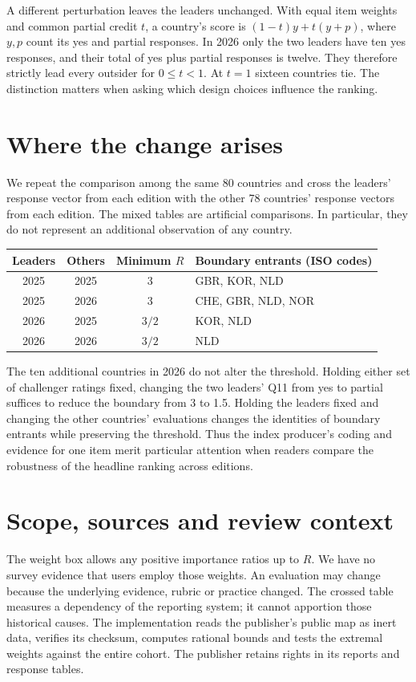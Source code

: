 \documentclass[11pt]{article}
\begin{document}
A different perturbation leaves the leaders unchanged. With equal item weights and common partial credit $t$, a country's score is $(1-t)y+t(y+p)$, where $y,p$ count its yes and partial responses. In 2026 only the two leaders have ten yes responses, and their total of yes plus partial responses is twelve. They therefore strictly lead every outsider for $0\le t<1$. At $t=1$ sixteen countries tie. The distinction matters when asking which design choices influence the ranking.

\section{Where the change arises}
We repeat the comparison among the same 80 countries and cross the leaders' response vector from each edition with the other 78 countries' response vectors from each edition. The mixed tables are artificial comparisons. In particular, they do not represent an additional observation of any country.

\begin{center}
\begin{tabular}{cccl}
\toprule
Leaders & Others & Minimum $R$ & Boundary entrants (ISO codes)\\
\midrule
2025 & 2025 & 3 & GBR, KOR, NLD\\
2025 & 2026 & 3 & CHE, GBR, NLD, NOR\\
2026 & 2025 & $3/2$ & KOR, NLD\\
2026 & 2026 & $3/2$ & NLD\\
\bottomrule
\end{tabular}
\end{center}

The ten additional countries in 2026 do not alter the threshold. Holding either set of challenger ratings fixed, changing the two leaders' Q11 from yes to partial suffices to reduce the boundary from 3 to 1.5. Holding the leaders fixed and changing the other countries' evaluations changes the identities of boundary entrants while preserving the threshold. Thus the index producer's coding and evidence for one item merit particular attention when readers compare the robustness of the headline ranking across editions.

\section{Scope, sources and review context}
The weight box allows any positive importance ratios up to $R$. We have no survey evidence that users employ those weights. An evaluation may change because the underlying evidence, rubric or practice changed. The crossed table measures a dependency of the reporting system; it cannot apportion those historical causes. The implementation reads the publisher's public map as inert data, verifies its checksum, computes rational bounds and tests the extremal weights against the entire cohort. The publisher retains rights in its reports and response tables.
\end{document}
